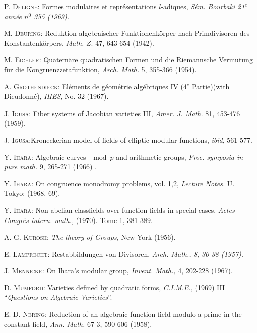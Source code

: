 \begin{thebibliography}{99}
 \textsc{P. Deligne:} Formes modulaires et repr\'esentations $l$-adiques, \textit{S\'em. Bourbaki 21$^e$ ann\'ee $n^0$ 355 (1969).}

 \textsc{M. Deuring:} Reduktion algebraischer Funktionenk\"orper nach Primdivisoren des Konstantenk\"orpers, \textit{Math.} $Z$. 47, 643-654 (1942).

 \textsc{M. Eichler:} Quatern\"are quadratischen Formen und die Riemannsche Vermutung f\"ur die Kongruenzzetafunktion, \textit{Arch. Math.} 5, 355-366 (1954).

 \textsc{A. Grothendieck:} El\'ements de g\'eom\'etrie alg\'ebriques IV (4$^e$ Partie)(with Dieudonn\'e), \textit{IHES}, No. 32 (1967).

 \textsc{J. Igusa:} Fiber systems of Jacobian varieties III, \textit{Amer. J. Math.} 81, 453-476 (1959).

 \textsc{J. Igusa:}\pageoriginale Kroneckerian model of fields of elliptic modular functions, \textit{ibid}, 561-577.

 \textsc{Y. Ihara:} Algebraic curves $\mod p$ and arithmetic groups, \textit{Proc. symposia in pure math.} 9, 265-271 (1966) .

 \textsc{Y. Ihara:} On congruence monodromy problems, vol. 1,2, \textit{Lecture Notes.} U. Tokyo; (1968, 69).

 \textsc{Y. Ihara:} Non-abelian classfields over function fields in special cases, \textit{Actes Congr\`es intern. math.,}  (1970). Tome 1, 381-389.

 \textsc{A. G. Kurosh:} \textit{The theory of Groups,} New York (1956).

 \textsc{E. Lamprecht:} Restabbildungen von Divisoren, \textit{Arch. Math., 8, 30-38 (1957).}

 \textsc{J. Mennicke:} On Ihara's modular group, \textit{Invent. Math.,} 4, 202-228 (1967).

 \textsc{D. Mumford:} Varieties defined by quadratic forms, \textit{C.I.M.E.,} (1969) III ``\textit{Questions on Algebraic Varieties}''.

 \textsc{E. D. Nering:} Reduction of an algebraic function field modulo a prime in the constant field, \textit{Ann. Math.} 67-3, 590-606 (1958).


\end{thebibliography}
